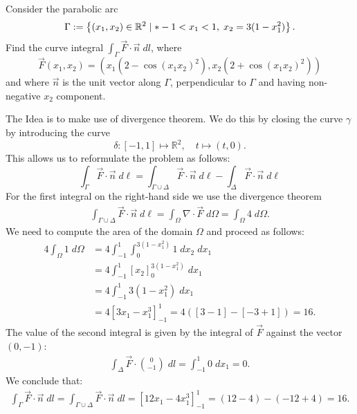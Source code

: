 \documentclass[11pt]{article}
\begin{document}
\begin{exercise}
    Consider the parabolic arc 
    \[
        \Gamma := \left\{ (x_1,x_2) \in \bbR^{2} \suchthat* -1 < x_1 < 1, \; x_2 = 3 ( 1 - x_1^2 ) \right\}.
    \]
    Find the curve integral $\int_\Gamma \vec F \cdot \vec{n} \;dl$, where 
    \[
        \vec F(x_1,x_2) 
        = 
        \left( 
            x_1 ( 2 - \cos(x_1x_2)^{2} )
            , 
            x_2 ( 2 + \cos(x_1x_2)^{2} ) 
        \right)
    \]
    and where $\vec{n}$ is the unit vector along $\Gamma$, perpendicular to $\Gamma$ and having non-negative $x_2$ component.
\end{exercise}
\begin{solution}
    The Idea is to make use of divergence theorem. 
    We do this by closing the curve $\gamma$ by introducing the curve 
    \[
        \delta: [-1,1] \mapsto \mathbb{R}^2, \quad t \mapsto  (t,0).
    \]
    This allows us to reformulate the problem as follows:
    \[
        \int_{\Gamma} \vec{F} \cdot \vec{n} \; d\ell
        =
        \int_{\Gamma\cup \Delta} \vec{F} \cdot \vec{n} \; d\ell
        -
        \int_{\Delta} \vec{F}\cdot \vec{n} \;d \ell
    \]
    For the first integral on the right-hand side we use the divergence theorem
    \begin{align*}
        \int_{\Gamma\cup\Delta} \vec{F} \cdot \vec{n} \; d\ell 
        = 
        \int_{\Omega} \nabla\cdot\vec{F}\;d \Omega
        =
        \int_{\Omega} 4\;d \Omega
        .
    \end{align*}
    We need to compute the area of the domain $\Omega$ and proceed as follows: 
    \begin{align*}
        4\int_{\Omega} 1\;d \Omega
        &=
        4 \int_{-1}^1\int_{0}^{3(1-x_1^2)} 1 \;d x_2 \;d x_1
        \\&=
        4 \int_{-1}^1\left[x_2\right]_{0}^{3(1-x_1^2)} \;d x_1
        \\&=
        4 \int_{-1}^1 3( 1-x_1^2)\;d x_1
        \\&=
        4 \left[ 3 x_1 - x_1^3 \right]_{-1}^1
        =
        4 \left( \left[ 3 - 1 \right] - \left[ -3 + 1 \right] \right)
        = 
        16
        .
    \end{align*}
    The value of the second integral is given by the integral of $\vec{F}$ against the vector $(0,-1)$:
    \begin{align*}
        \int_{\Delta} \vec{F} \cdot \binom{0}{-1} \; dl
        =
        \int_{-1}^1 0 \; dx_1
        =
        0
        .
    \end{align*}
    We conclude that:
    \begin{align*}
        \int_{\Gamma} \vec{F} \cdot \vec{n} \; dl
        = 
        \int_{\Gamma\cup \Delta} \vec{F} \cdot \vec{n} \; dl
        =
        \left[ 12 x_1 - 4 x_1^3 \right]_{-1}^1
        =
        ( 12 - 4 ) - ( -12 + 4 )
        = 
        16.
    \end{align*}
\end{solution}
\end{document}

